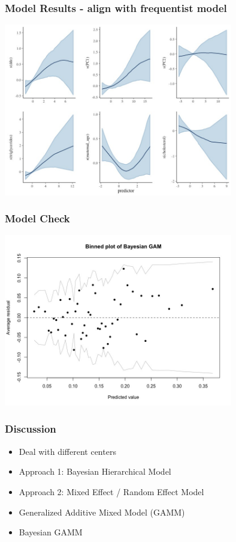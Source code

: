 \documentclass{beamer}
\begin{document}
\begin{frame}
\frametitle{Model Results - align with frequentist model}
\includegraphics[width = 10cm]{BGAM.jpeg}
\end{frame}



\begin{frame}
\frametitle{Model Check}
\includegraphics[width = 10cm]{BGAM2.jpeg}

\end{frame}














\begin{frame}
\frametitle{Discussion}



\begin{itemize}

\item Deal with different centers
\pause
\item Approach 1: Bayesian Hierarchical Model
\item Approach 2: Mixed Effect / Random Effect Model
\pause
\item Generalized Additive Mixed Model (GAMM)
\item Bayesian GAMM 


\end{itemize}
\end{frame}
\end{document}
